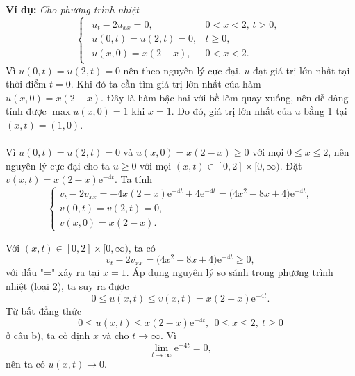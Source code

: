 \documentclass[10pt, a4paper]{article}
\begin{document}
	\textbf{Ví dụ:} \textit{Cho phương trình nhiệt} $$\begin{cases}
	\begin{array}{ll}
		u_t-2u_{xx}=0, & 0<x<2,\,t>0,\\
		u(0,t)=u(2,t)=0, & t\ge0,\\
		u(x,0)=x(2-x), & 0<x<2.
	\end{array}
	\end{cases}$$
	\textit{\color{violet}{a) Tìm giá trị lớn nhất của $u(x,t)$ trên miền $[0,2]\times[0,\infty)$.}}\vskip8pt
	Vì $u(0,t)=u(2,t)=0$ nên theo nguyên lý cực đại, $u$ đạt giá trị lớn nhất tại thời điểm $t=0$. Khi đó ta cần tìm giá trị lớn nhất của hàm $u(x,0)=x(2-x).$\vskip8pt
	Đây là hàm bậc hai với bề lõm quay xuống, nên dễ dàng tính được $\max u(x,0)=1$ khi $x=1$.\vskip8pt
	Do đó, giá trị lớn nhất của $u$ bằng 1 tại $(x,t)=(1,0)$.\\\\
	\textit{\color{violet}{b) Chứng tỏ rằng $0\le u(x,t)\le x(2-x)\mathrm e^{-4t}$ với mọi $(x,t)\in[0,2]\times[0,\infty)$.}}\vskip8pt
	Vì $u(0,t)=u(2,t)=0$ và $u(x,0)=x(2-x)\ge0$ với mọi $0\le x\le2$, nên nguyên lý cực đại cho ta $u\ge0$ với mọi $(x,t)\in[0,2]\times[0,\infty)$.\vskip8pt
	Đặt $v(x,t)=x(2-x)\mathrm e^{-4t}$. Ta tính $$\begin{cases}
			v_t-2v_{xx}=-4x(2-x)\mathrm e^{-4t}+4\mathrm e^{-4t}=\big(4x^2-8x+4\big)\mathrm e^{-4t},\\
			v(0,t)=v(2,t)=0,\\
			v(x,0)=x(2-x).
	\end{cases}$$
	
	Với $(x,t)\in[0,2]\times[0,\infty)$, ta có $$v_t-2v_{xx}=\big(4x^2-8x+4\big)\mathrm e^{-4t}\ge0,$$
	với dấu "=" xảy ra tại $x=1$. Áp dụng nguyên lý so sánh trong phương trình nhiệt (loại 2), ta suy ra được $$0\le u(x,t)\le v(x,t)=x(2-x)\mathrm e^{-4t}.$$
	\textit{\color{violet}{c) Cố định $x\in[0,2]$, hãy cho biết khi $t\to\infty$ thì $u(x,t)$ càng tiến về bao nhiêu?}}\vskip8pt
	Từ bất đẳng thức $$0\le u(x,t)\le x(2-x)\mathrm e^{-4t},~~0\le x\le2,~t\ge0$$
	ở câu b), ta cố định $x$ và cho $t\to\infty$. Vì $$\lim_{t\to\infty}\mathrm e^{-4t}=0,$$
	nên ta có $u(x,t)\to0$.
\end{document}
